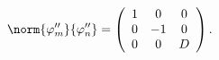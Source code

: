 \begin{equation}
%
\norm{\varphi''_{m}}{\varphi''_{n}}
=
        \left( \begin{array}{cccccc}
                1 & 0  & 0 \\
                0 & -1 & 0 \\
                0 & 0  & D
        \end{array} \right).
%
\end{equation}

